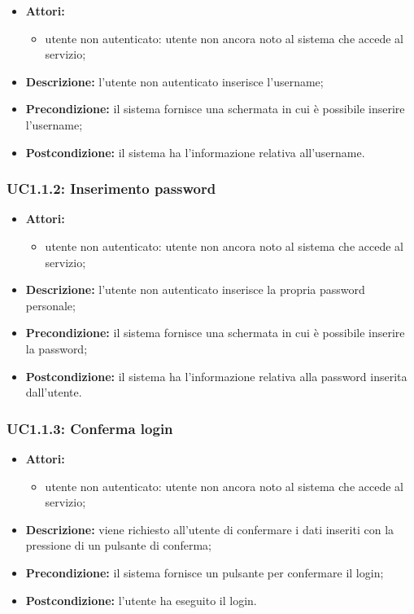 \begin{itemize}
	\item \textbf{Attori:}
	\begin{itemize}
		\item utente non autenticato: utente non ancora noto al sistema che accede al servizio;
	\end{itemize}
	\item \textbf{Descrizione:} l'utente non autenticato inserisce l'username;
	\item \textbf{Precondizione:} il sistema fornisce una schermata in cui è possibile inserire l’username;
	\item \textbf{Postcondizione:} il sistema ha l'informazione relativa all'username.
\end{itemize}

\subsubsection{UC1.1.2: Inserimento password}

\begin{itemize}
	\item \textbf{Attori:}
	\begin{itemize}
		\item utente non autenticato: utente non ancora noto al sistema che accede al servizio;
	\end{itemize}
	\item \textbf{Descrizione:} l'utente non autenticato inserisce la propria password personale;
	\item \textbf{Precondizione:} il sistema fornisce una schermata in cui è possibile inserire la password;
	\item \textbf{Postcondizione:} il sistema ha l'informazione relativa alla password inserita dall'utente.
\end{itemize}

\subsubsection{UC1.1.3: Conferma login}

\begin{itemize}
	\item \textbf{Attori:}
	\begin{itemize}
		\item utente non autenticato: utente non ancora noto al sistema che accede al servizio;
	\end{itemize}
	\item \textbf{Descrizione:} viene richiesto all'utente di confermare i dati inseriti con la pressione di un pulsante di conferma;
	\item \textbf{Precondizione:} il sistema fornisce un pulsante per confermare il login;
	\item \textbf{Postcondizione:} l'utente ha eseguito il login.
\end{itemize}

